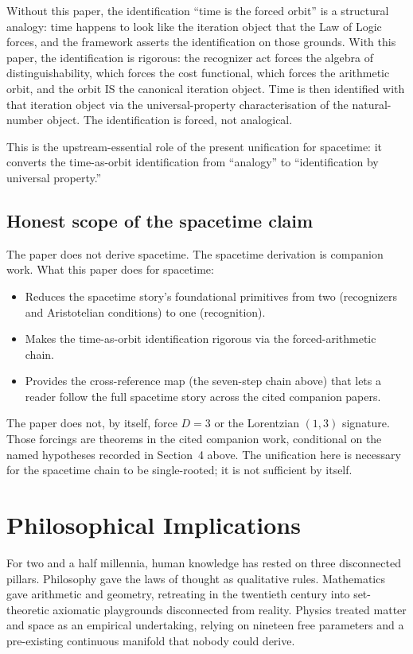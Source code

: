 \documentclass[11pt,a4paper]{article}
\theoremstyle{definition}
\theoremstyle{remark}
\begin{document}
Without this paper, the identification ``time is the forced orbit''
is a structural analogy: time happens to look like the iteration
object that the Law of Logic forces, and the framework asserts the
identification on those grounds. With this paper, the identification
is rigorous: the recognizer act forces the algebra of
distinguishability, which forces the cost functional, which forces
the arithmetic orbit, and the orbit IS the canonical iteration
object. Time is then identified with that iteration object via
the universal-property characterisation of the natural-number
object. The identification is forced, not analogical.

This is the upstream-essential role of the present unification for
spacetime: it converts the time-as-orbit identification from
``analogy'' to ``identification by universal property.''

\subsection{Honest scope of the spacetime claim}

The paper does not derive spacetime. The spacetime derivation is
companion work. What this paper does for spacetime:

\begin{itemize}[leftmargin=1.6em]
\item Reduces the spacetime story's foundational primitives from two
(recognizers and Aristotelian conditions) to one (recognition).
\item Makes the time-as-orbit identification rigorous via the
forced-arithmetic chain.
\item Provides the cross-reference map (the seven-step chain above)
that lets a reader follow the full spacetime story across the cited
companion papers.
\end{itemize}

The paper does not, by itself, force $D = 3$ or the Lorentzian
$(1, 3)$ signature. Those forcings are theorems in the cited
companion work, conditional on the named hypotheses recorded in
Section~4 above. The unification here is necessary for the spacetime
chain to be single-rooted; it is not sufficient by itself.

\section{Philosophical Implications}

For two and a half millennia, human knowledge has rested on three disconnected pillars. Philosophy gave the laws of thought as qualitative rules. Mathematics gave arithmetic and geometry, retreating in the twentieth century into set-theoretic axiomatic playgrounds disconnected from reality. Physics treated matter and space as an empirical undertaking, relying on nineteen free parameters and a pre-existing continuous manifold that nobody could derive.
\end{document}
